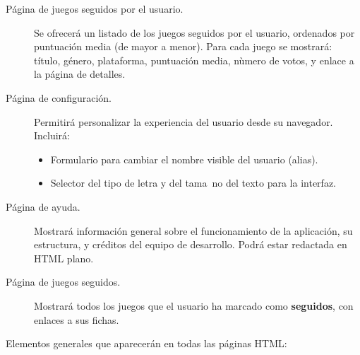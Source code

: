 \begin{description}
\item[Página de juegos seguidos por el usuario.] Se ofrecerá un listado de los juegos seguidos por el usuario, ordenados por puntuación media (de mayor a menor). Para cada juego se mostrará: título, género, plataforma, puntuación media, nùmero de votos, y enlace a la página de detalles.

\item[Página de configuración.] Permitirá personalizar la experiencia del usuario desde su navegador. Incluirá:
\begin{itemize}
\item Formulario para cambiar el nombre visible del usuario (alias).
\item Selector del tipo de letra y del tama~no del texto para la interfaz.
\end{itemize}

\item[Página de ayuda.] Mostrará información general sobre el funcionamiento de la aplicación, su estructura, y créditos del equipo de desarrollo. Podrá estar redactada en HTML plano.

\item[Página de juegos seguidos.] Mostrará todos los juegos que el usuario ha marcado como \textbf{seguidos}, con enlaces a sus fichas.
\end{description}



Elementos generales que aparecerán en todas las páginas HTML:

